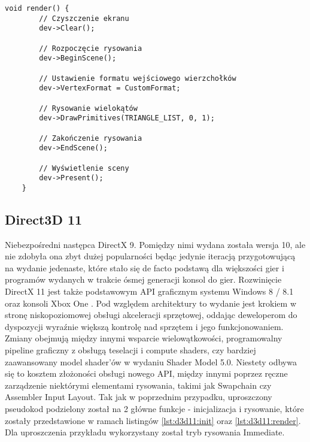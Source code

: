 \begin{lstlisting}[caption={Funkcja rysowania przy pomocy Managed DirectX}, label={lst:manageddx:drawing}]
	void render() {
		// Czyszczenie ekranu
		dev->Clear();
		
		// Rozpoczęcie rysowania
		dev->BeginScene();
		
		// Ustawienie formatu wejściowego wierzchołków
		dev->VertexFormat = CustomFormat;
		
		// Rysowanie wielokątów
		dev->DrawPrimitives(TRIANGLE_LIST, 0, 1);
		
		// Zakończenie rysowania
		dev->EndScene();
		
		// Wyświetlenie sceny
		dev->Present();
	}
\end{lstlisting}

\subsection{Direct3D 11}

Niebezpośredni następca DirectX 9. Pomiędzy nimi wydana została wersja
10, ale nie zdobyła ona zbyt dużej popularności będąc jedynie iteracją
przygotowującą na wydanie jedenaste, które stało się de facto podstawą
dla większości gier i programów wydanych w trakcie ósmej generacji
konsol do gier. Rozwinięcie DirectX 11 jest także podstawowym API graficznym systemu
Windows 8 / 8.1 oraz konsoli Xbox One \cite{ms:raisingbar:2024}. Pod względem architektury to wydanie jest krokiem w stronę
niskopoziomowej obsługi akceleracji sprzętowej, oddając deweloperom do
dyspozycji wyraźnie większą kontrolę nad sprzętem i jego
funkcjonowaniem. Zmiany obejmują między innymi wsparcie wielowątkowości,
programowalny pipeline graficzny z obsługą teselacji i compute shaders,
czy bardziej zaawansowany model shader'ów w wydaniu Shader Model 5.0. Niestety odbywa się to kosztem złożoności obsługi nowego API, między
innymi poprzez ręczne zarządzenie niektórymi elementami rysowania,
takimi jak Swapchain czy Assembler Input Layout. Tak jak w poprzednim przypadku, uproszczony pseudokod podzielony został
na 2 główne funkcje - inicjalizacja i rysowanie, które zostały przedstawione w ramach listingów \ref{lst:d3d11:init} oraz \ref{lst:d3d11:render}. Dla uproszczenia przykładu wykorzystany został tryb rysowania Immediate.

